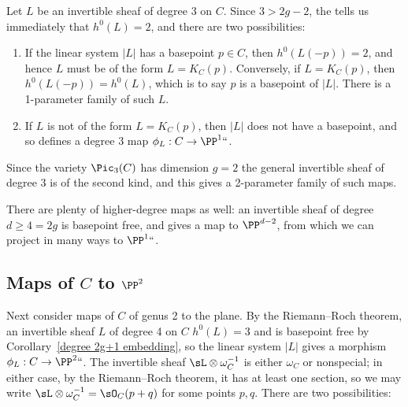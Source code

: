  Let $L$ be an invertible sheaf of degree 3 on $C$. Since $3 > 2g-2$,
 the
%
 tells us immediately that $h^0(L) = 2$, and
 there are two possibilities:

\begin{enumerate}
\item If the linear system $|L|$ has a basepoint $p \in C$,
then $h^0(L(-p)) = 2$, and hence $L$ must be of the form $L =
K_C(p)$. Conversely, if $L = K_C(p)$, then $h^0(L(-p)) = h^0(L)$, which
is to say $p$ is a basepoint of $|L|$. There is a 1-parameter family of
such $L$.

\item If $L$ is not of the form $L = K_C(p)$, then $|L|$ does not have
\label{genus 2 pencil} %
a basepoint, and so defines a degree 3 map $\phi_L : C \to \PP^1` `$.
\end{enumerate}

Since the variety $\Pic_3(C)$ has dimension $g= 2$ the general invertible
sheaf of degree 3 is of the second kind, and this gives a 2-parameter
family of such maps.

There are plenty of higher-degree maps as well: an invertible sheaf of
degree $d \geq 4 = 2g$ is basepoint free, and gives a map to $\PP^{d-2}$,
from which we can project in many ways
to $\PP^1` `$.

\subsection*{Maps of $C$ to $\PP^2$}
Next consider maps of $C$ of genus 2 to the plane. By the Riemann--Roch
%
theorem, an invertible sheaf $L$ of degree 4 on $C$
$h^0(L)
= 3$ and is basepoint free by Corollary~\ref{degree 2g+1 embedding}, so
the linear system $|L|$  gives a morphism $\phi_L : C \to \PP^2` `$. The
invertible sheaf $\sL\otimes \omega_C^{-1}$ is either
$\omega_C$ or nonspecial; in either case, by the Riemann--Roch theorem,
it has at least one section,
so we may write $\sL\otimes \omega_C^{-1} = \sO_C(p+q)$ for some points
$p,q$. There are two possibilities:

